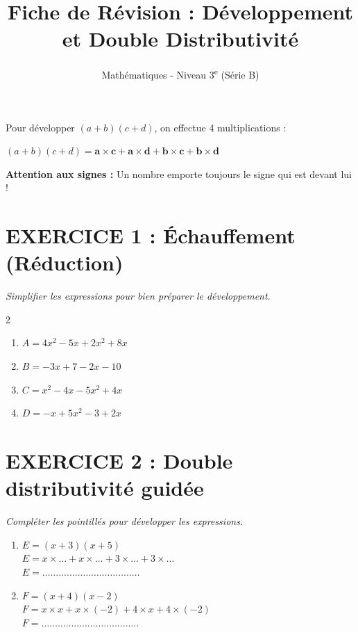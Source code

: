 \documentclass[11pt,a4paper]{article}
\title{\textbf{Fiche de Révision : Développement et Double Distributivité}}
\author{Mathématiques - Niveau 3\textsuperscript{e} (Série B)}
\begin{document}
\maketitle

    \begin{tcolorbox}[colback=green!5!white,colframe=green!50!black,title=Méthode : La Double Distributivité]
    Pour développer $(a + b)(c + d)$, on effectue 4 multiplications :
    \begin{center}
        $(a + b)(c + d) = \mathbf{a \times c} + \mathbf{a \times d} + \mathbf{b \times c} + \mathbf{b \times d}$
    \end{center}
    \textbf{Attention aux signes :} Un nombre emporte toujours le signe qui est devant lui !
    \end{tcolorbox}
    
    \section*{EXERCICE 1 : Échauffement (Réduction)}
    \textit{Simplifier les expressions pour bien préparer le développement.}
    \begin{multicols}{2}
    \begin{enumerate}
        \item $A = 4x^2 - 5x + 2x^2 + 8x$
        \item $B = -3x + 7 - 2x - 10$
        \item $C = x^2 - 4x - 5x^2 + 4x$
        \item $D = -x + 5x^2 - 3 + 2x$
    \end{enumerate}
    \end{multicols}
    
    \section*{EXERCICE 2 : Double distributivité guidée}
    \textit{Compléter les pointillés pour développer les expressions.}
    
    \begin{enumerate}
        \item $E = (x + 3)(x + 5)$ \\
        $E = x \times \dots + x \times \dots + 3 \times \dots + 3 \times \dots$ \\
        $E = \dots\dots\dots\dots\dots\dots\dots\dots\dots\dots\dots\dots$
        
        \item $F = (x + 4)(x - 2)$ \\
        $F = x \times x + x \times (-2) + 4 \times x + 4 \times (-2)$ \\
        $F = \dots\dots\dots\dots\dots\dots\dots\dots\dots\dots\dots\dots$
    \end{enumerate}
    
\end{document}
